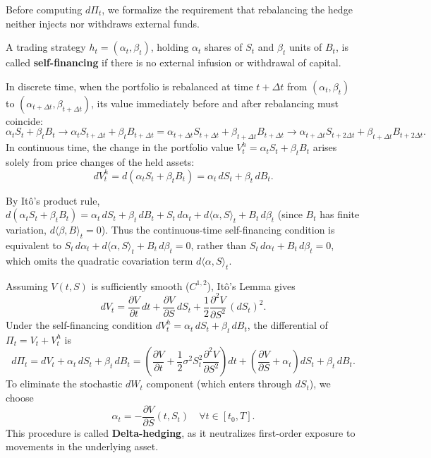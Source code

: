 Before computing $d\Pi_t$, we formalize the requirement that rebalancing the hedge neither injects nor withdraws external funds.

\begin{definition}
    \label{def:ch04-self-financing}
    A trading strategy $h_t = (\alpha_t, \beta_t)$, holding $\alpha_t$ shares of $S_t$ and $\beta_t$ units of $B_t$, is called \textbf{self-financing} if there is no external infusion or withdrawal of capital.

    In discrete time, when the portfolio is rebalanced at time $t + \Delta t$ from $(\alpha_t, \beta_t)$ to $(\alpha_{t+\Delta t}, \beta_{t+\Delta t})$, its value immediately before and after rebalancing must coincide:
    \[
        \alpha_t S_t + \beta_t B_t
        \longrightarrow \alpha_t S_{t+\Delta t} + \beta_t B_{t+\Delta t}
        = \alpha_{t+\Delta t} S_{t+\Delta t} + \beta_{t+\Delta t} B_{t+\Delta t}
        \longrightarrow \alpha_{t+\Delta t} S_{t+2\Delta t} + \beta_{t+\Delta t} B_{t+2\Delta t}.
    \]
    In continuous time, the change in the portfolio value $V_t^h = \alpha_t S_t + \beta_t B_t$ arises solely from price changes of the held assets:
    \[
        dV_t^h = d(\alpha_t S_t + \beta_t B_t) = \alpha_t\,dS_t + \beta_t\,dB_t.
    \]
\end{definition}

\begin{remark}
    By It\^o's product rule, $d(\alpha_t S_t + \beta_t B_t) = \alpha_t\,dS_t + \beta_t\,dB_t + S_t\,d\alpha_t + d\langle \alpha, S \rangle_t + B_t\,d\beta_t$ (since $B_t$ has finite variation, $d\langle \beta, B \rangle_t = 0$). Thus the continuous-time self-financing condition is equivalent to $S_t\,d\alpha_t + d\langle \alpha, S \rangle_t + B_t\,d\beta_t = 0$, rather than $S_t\,d\alpha_t + B_t\,d\beta_t = 0$, which omits the quadratic covariation term $d\langle \alpha, S \rangle_t$.
\end{remark}

Assuming $V(t, S)$ is sufficiently smooth ($C^{1,2}$), It\^o's Lemma gives
\[
    dV_t = \frac{\partial V}{\partial t}\,dt + \frac{\partial V}{\partial S}\,dS_t + \frac{1}{2}\frac{\partial^2 V}{\partial S^2}\,(dS_t)^2.
\]
Under the self-financing condition $dV_t^h = \alpha_t\,dS_t + \beta_t\,dB_t$, the differential of $\Pi_t = V_t + V_t^h$ is
\[
    d\Pi_t = dV_t + \alpha_t\,dS_t + \beta_t\,dB_t
    = \left(\frac{\partial V}{\partial t} + \frac{1}{2}\sigma^2 S_t^2 \frac{\partial^2 V}{\partial S^2}\right)dt + \left(\frac{\partial V}{\partial S} + \alpha_t\right)dS_t + \beta_t\,dB_t.
\]
To eliminate the stochastic $dW_t$ component (which enters through $dS_t$), we choose
\[
    \alpha_t = -\frac{\partial V}{\partial S}(t, S_t) \quad \forall t \in [t_0, T].
\]
This procedure is called \textbf{Delta-hedging}, as it neutralizes first-order exposure to movements in the underlying asset.

